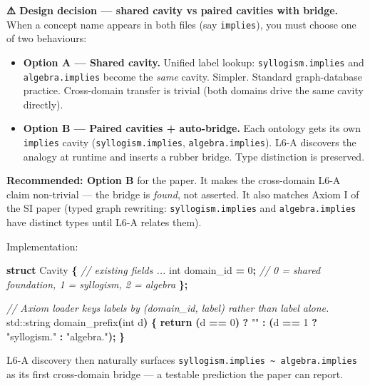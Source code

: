 \documentclass[
  11pt,
  a4paper,
]{article}
\newenvironment{Shaded}{\begin{snugshade}}{\end{snugshade}}
\newcommand{\BuiltInTok}[1]{#1}
\newcommand{\CommentTok}[1]{\textcolor[rgb]{0.56,0.35,0.01}{\textit{#1}}}
\newcommand{\ControlFlowTok}[1]{\textcolor[rgb]{0.13,0.29,0.53}{\textbf{#1}}}
\newcommand{\DataTypeTok}[1]{\textcolor[rgb]{0.13,0.29,0.53}{#1}}
\newcommand{\DecValTok}[1]{\textcolor[rgb]{0.00,0.00,0.81}{#1}}
\newcommand{\KeywordTok}[1]{\textcolor[rgb]{0.13,0.29,0.53}{\textbf{#1}}}
\newcommand{\NormalTok}[1]{#1}
\newcommand{\OperatorTok}[1]{\textcolor[rgb]{0.81,0.36,0.00}{\textbf{#1}}}
\newcommand{\StringTok}[1]{\textcolor[rgb]{0.31,0.60,0.02}{#1}}
\providecommand{\tightlist}{%
  \setlength{\itemsep}{0pt}\setlength{\parskip}{0pt}}
\begin{document}
\textbf{⚠️ Design decision --- shared cavity vs paired cavities with
bridge.} When a concept name appears in both files (say
\texttt{implies}), you must choose one of two behaviours:

\begin{itemize}
\tightlist
\item
  \textbf{Option A --- Shared cavity.} Unified label lookup:
  \texttt{syllogism.implies} and \texttt{algebra.implies} become the
  \emph{same} cavity. Simpler. Standard graph-database practice.
  Cross-domain transfer is trivial (both domains drive the same cavity
  directly).
\item
  \textbf{Option B --- Paired cavities + auto-bridge.} Each ontology
  gets its own \texttt{implies} cavity (\texttt{syllogism.implies},
  \texttt{algebra.implies}). L6-A discovers the analogy at runtime and
  inserts a rubber bridge. Type distinction is preserved.
\end{itemize}

\textbf{Recommended: Option B} for the paper. It makes the cross-domain
L6-A claim non-trivial --- the bridge is \emph{found}, not asserted. It
also matches Axiom I of the SI paper (typed graph rewriting:
\texttt{syllogism.implies} and \texttt{algebra.implies} have distinct
types until L6-A relates them).

Implementation:

\begin{Shaded}
\begin{Highlighting}[]
\KeywordTok{struct}\NormalTok{ Cavity }\OperatorTok{\{}
    \CommentTok{// existing fields ...}
    \DataTypeTok{int}\NormalTok{ domain\_id }\OperatorTok{=} \DecValTok{0}\OperatorTok{;}   \CommentTok{// 0 = shared foundation, 1 = syllogism, 2 = algebra}
\OperatorTok{\};}

\CommentTok{// Axiom loader keys labels by (domain\_id, label) rather than label alone.}
\BuiltInTok{std::}\NormalTok{string domain\_prefix}\OperatorTok{(}\DataTypeTok{int}\NormalTok{ d}\OperatorTok{)} \OperatorTok{\{}
    \ControlFlowTok{return} \OperatorTok{(}\NormalTok{d }\OperatorTok{==} \DecValTok{0}\OperatorTok{)} \OperatorTok{?} \StringTok{""} \OperatorTok{:} \OperatorTok{(}\NormalTok{d }\OperatorTok{==} \DecValTok{1} \OperatorTok{?} \StringTok{"syllogism."} \OperatorTok{:} \StringTok{"algebra."}\OperatorTok{);}
\OperatorTok{\}}
\end{Highlighting}
\end{Shaded}

L6-A discovery then naturally surfaces
\texttt{syllogism.implies\ \textasciitilde{}\ algebra.implies} as its
first cross-domain bridge --- a testable prediction the paper can
report.
\end{document}
